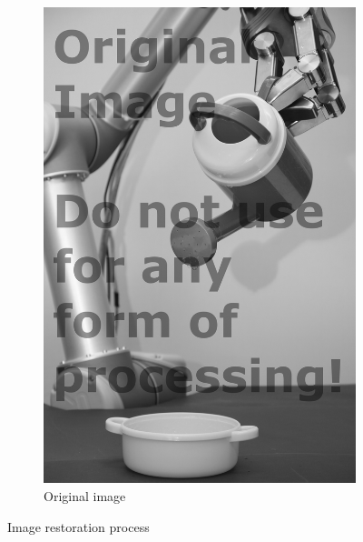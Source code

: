 \begin{figure}[H]
\begin{subfigure}[b]{0.24\textwidth}
        \includegraphics[width=\textwidth]{org.png}
        \caption{Original image}
    \end{subfigure}   
    \caption{Image restoration process}
\end{figure}


